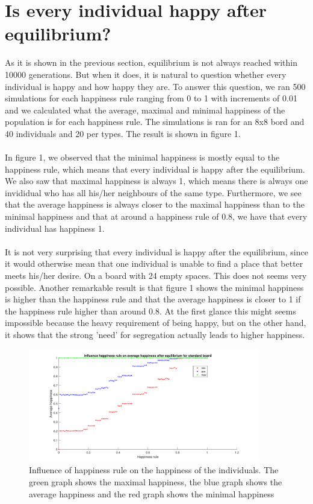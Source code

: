 \documentclass{article}
\begin{document}
\section{Is every individual happy after equilibrium?}
As it is shown in the previous section, equilibrium is not always reached within 10000 generations. But when it does, it is natural to question whether every individual is happy and how happy they are. To answer this question, we ran 500 simulations for each happiness rule ranging from 0 to 1 with increments of 0.01 and we calculated what the average, maximal and minimal happiness of the population is for each happiness rule. The simulations is ran for an 8x8 bord and 40 individuals and 20 per types. The result is shown in figure 1.\\
\\
In figure 1, we observed that the minimal happiness is mostly equal to the happiness rule, which means that every individual is happy after the equilibrium. We also saw that maximal happiness is always 1, which means there is always one invididual who has all his/her neighbours of the same type. Furthermore, we see that the average happiness is always closer to the maximal happiness than to the minimal happiness and that at around a happiness rule of 0.8, we have that every individual has happiness 1.\\
\\
It is not very surprising that every individual is happy after the equilibrium, since it would otherwise mean that one individual is unable to find a place that better meets his/her desire. On a board with 24 empty spaces. This does not seems very possible. Another remarkable result is that figure 1 shows the minimal happiness is higher than the happiness rule and that the average happiness is closer to 1 if the happiness rule higher than around 0.8. At the first glance this might seems impossible because the heavy requirement of being happy, but on the other hand, it shows that the strong 'need' for segregation actually leads to higher happiness.
\begin{figure}[h!]
    \centering
    \includegraphics[width=0.9\textwidth]{happinessregel-gemhappinesseind-2}
    \caption{Influence of happiness rule on the happiness of the individuals. The green graph shows the maximal happiness, the blue graph shows the average happiness and the red graph shows the minimal happiness}
\end{figure}
\end{document}
